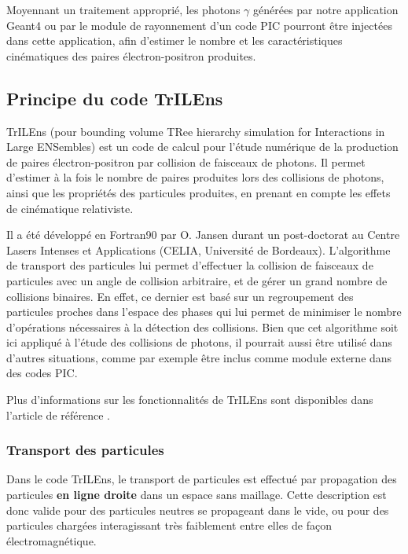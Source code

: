 \begin{refsection}
Moyennant un traitement approprié, les photons $\gamma$ générées par notre application Geant4 ou par le module de rayonnement d'un code PIC pourront être injectées dans cette application, afin d'estimer le nombre et les caractéristiques cinématiques des paires électron-positron produites.

\subsection{Principe du code TrILEns}

TrILEns (pour bounding volume TRee hierarchy simulation for Interactions in Large ENSembles) est un code de calcul pour l'étude numérique de la production de paires électron-positron par collision de faisceaux de photons. Il permet d'estimer à la fois le nombre de paires produites lors des collisions de photons, ainsi que les propriétés des particules produites, en prenant en compte les effets de cinématique relativiste.


Il a été développé en Fortran90 par O. Jansen durant un post-doctorat au Centre Lasers Intenses et Applications (CELIA, Université de Bordeaux). L'algorithme de transport des particules lui permet d'effectuer la collision de faisceaux de particules avec un angle de collision arbitraire, et de gérer un grand nombre de collisions binaires. En effet, ce dernier est basé sur un regroupement des particules proches dans l'espace des phases qui lui permet de minimiser le nombre d'opérations nécessaires à la détection des collisions. Bien que cet algorithme soit ici appliqué à l'étude des collisions de photons, il pourrait aussi être utilisé dans d'autres situations, comme par exemple être inclus comme module externe dans des codes PIC.


Plus d'informations sur les fonctionnalités de TrILEns sont disponibles dans l'article de référence \cite{jansen_2018}.


\subsubsection{Transport des particules}

Dans le code TrILEns, le transport de particules est effectué par propagation des particules \textbf{en ligne droite} dans un espace sans maillage. Cette description est donc valide pour des particules neutres se propageant dans le vide, ou pour des particules chargées interagissant très faiblement entre elles de façon électromagnétique.


\end{refsection}
